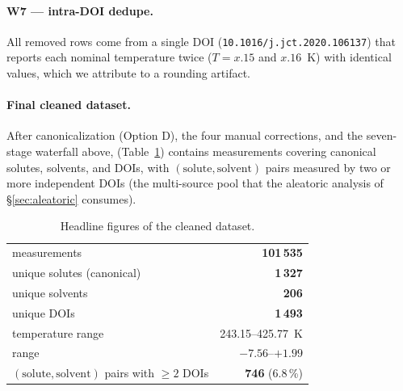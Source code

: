 \paragraph{W7 --- intra-DOI dedupe.}  All  removed rows come
from a single DOI (\texttt{10.1016/j.jct.2020.106137}) that reports
each nominal temperature twice ($T = x.15$ and $x.16$~K) with identical
\logS{} values, which we attribute to a rounding artifact.

\paragraph{Final cleaned dataset.}
After canonicalization (Option D), the four manual corrections, and the seven-stage waterfall above, \scthree{} (Table~\ref{tab:final_cleaned}) contains  measurements covering  canonical solutes,  solvents, and  DOIs, with  $(\text{solute}, \text{solvent})$ pairs measured by two or more independent DOIs (the multi-source pool that the aleatoric analysis of §\ref{sec:aleatoric} consumes). 

\begin{table}[h]
\centering\small
\caption{Headline figures of the cleaned \scthree{} dataset.}
\label{tab:final_cleaned}
\begin{tabular}{@{}lr@{}}
\toprule
measurements                                                 & \textbf{101\,535} \\
unique solutes (canonical)                                   & \textbf{1\,327}   \\
unique solvents                                              & \textbf{206}      \\
unique DOIs                                                  & \textbf{1\,493}   \\
temperature range                                            & 243.15--425.77~K  \\
\logS{} range                                                & $-7.56$--$+1.99$  \\
$(\text{solute}, \text{solvent})$ pairs with $\geq 2$ DOIs   & \textbf{746} (6.8\,\%) \\
\bottomrule
\end{tabular}
\end{table}
